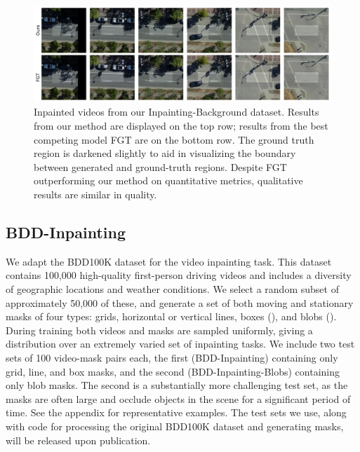 \begin{figure}[t]
\centering
\includegraphics[width=\linewidth]{figures/bg_3119.pdf}
\caption[A comparison of inpaintings from our method and FGT on a video from our Inpainting-Background dataset.]{Inpainted videos from our Inpainting-Background dataset. Results from our method are displayed on the top row; results from the best competing model FGT \citep{fgt} are on the bottom row. The ground truth region is darkened slightly to aid in visualizing the boundary between generated and ground-truth regions. Despite FGT outperforming our method on quantitative metrics, qualitative results are similar in quality.}
\label{fig:background}
\end{figure}
\subsection{BDD-Inpainting}
We adapt the BDD100K \citep{bdd100k} dataset for the video inpainting task. This dataset contains 100,000 high-quality first-person driving videos and includes a diversity of geographic locations and weather conditions. We select a random subset of approximately 50,000 
of these, and generate a set of both moving and stationary masks of four types: grids, horizontal or vertical lines, boxes (), and blobs (). During training both videos and masks are sampled uniformly, giving a distribution over an extremely varied set of inpainting tasks. We include two test sets of 100 video-mask pairs each, the first (BDD-Inpainting) containing only grid, line, and box masks, and the second (BDD-Inpainting-Blobs) containing only blob masks. The second is a substantially more challenging test set, as the masks are often large and occlude objects in the scene for a significant period of time. See the appendix for representative examples. The test sets we use, along with code for processing the original BDD100K dataset and generating masks, will be released upon publication. 
